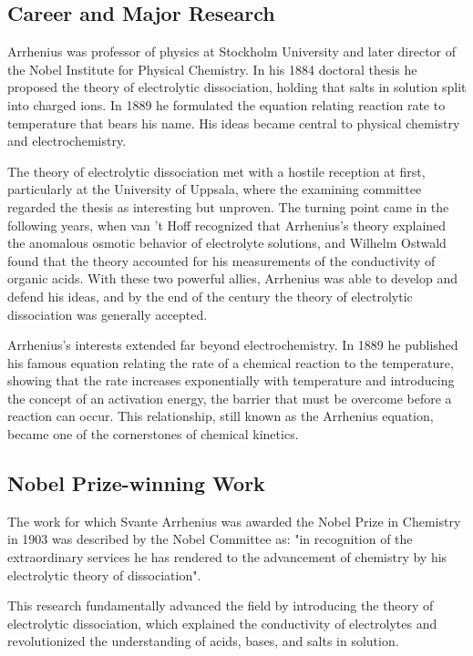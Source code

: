 \subsection*{Career and Major Research}

Arrhenius was professor of physics at Stockholm University and later director of the Nobel Institute for Physical Chemistry. In his 1884 doctoral thesis he proposed the theory of electrolytic dissociation, holding that salts in solution split into charged ions. In 1889 he formulated the equation relating reaction rate to temperature that bears his name. His ideas became central to physical chemistry and electrochemistry.

The theory of electrolytic dissociation met with a hostile reception at first, particularly at the University of Uppsala, where the examining committee regarded the thesis as interesting but unproven. The turning point came in the following years, when van 't Hoff recognized that Arrhenius's theory explained the anomalous osmotic behavior of electrolyte solutions, and Wilhelm Ostwald found that the theory accounted for his measurements of the conductivity of organic acids. With these two powerful allies, Arrhenius was able to develop and defend his ideas, and by the end of the century the theory of electrolytic dissociation was generally accepted.

Arrhenius's interests extended far beyond electrochemistry. In 1889 he published his famous equation relating the rate of a chemical reaction to the temperature, showing that the rate increases exponentially with temperature and introducing the concept of an activation energy, the barrier that must be overcome before a reaction can occur. This relationship, still known as the Arrhenius equation, became one of the cornerstones of chemical kinetics.

\subsection*{Nobel Prize-winning Work}

The work for which Svante Arrhenius was awarded the Nobel Prize in Chemistry in 1903 was described by the Nobel Committee as: "in recognition of the extraordinary services he has rendered to the advancement of chemistry by his electrolytic theory of dissociation".

This research fundamentally advanced the field by introducing the theory of electrolytic dissociation, which explained the conductivity of electrolytes and revolutionized the understanding of acids, bases, and salts in solution.

